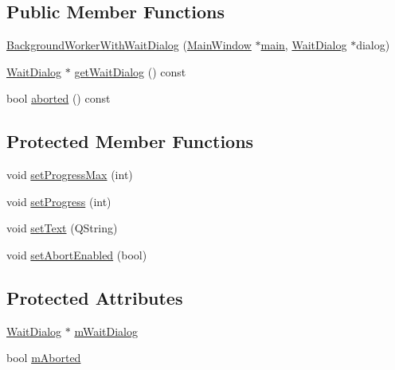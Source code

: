 \subsection*{Public Member Functions}
\begin{DoxyCompactItemize}
\item 
\mbox{\hyperlink{class_background_worker_with_wait_dialog_a08183457d88d75535d04dabe4cca054c}{Background\+Worker\+With\+Wait\+Dialog}} (\mbox{\hyperlink{class_main_window}{Main\+Window}} $\ast$\mbox{\hyperlink{tseditor_8cpp_a0ddf1224851353fc92bfbff6f499fa97}{main}}, \mbox{\hyperlink{class_wait_dialog}{Wait\+Dialog}} $\ast$dialog)
\item 
\mbox{\hyperlink{class_wait_dialog}{Wait\+Dialog}} $\ast$ \mbox{\hyperlink{class_background_worker_with_wait_dialog_a894bacbc35d673d590ebb5a6ab35a6ae}{get\+Wait\+Dialog}} () const
\item 
bool \mbox{\hyperlink{class_background_worker_with_wait_dialog_a69cf3dcfd7e70265bf3183ebae7cbb3e}{aborted}} () const
\end{DoxyCompactItemize}
\subsection*{Protected Member Functions}
\begin{DoxyCompactItemize}
\item 
void \mbox{\hyperlink{class_background_worker_with_wait_dialog_a30a068ba9e1d62d5e612bc19246c79bd}{set\+Progress\+Max}} (int)
\item 
void \mbox{\hyperlink{class_background_worker_with_wait_dialog_a20d1050c20550a82493f475a4b438ba0}{set\+Progress}} (int)
\item 
void \mbox{\hyperlink{class_background_worker_with_wait_dialog_a1a45199885114d5f9940dff1253d2a31}{set\+Text}} (Q\+String)
\item 
void \mbox{\hyperlink{class_background_worker_with_wait_dialog_a19409fbbcbca84367eca808dddd12659}{set\+Abort\+Enabled}} (bool)
\end{DoxyCompactItemize}
\subsection*{Protected Attributes}
\begin{DoxyCompactItemize}
\item 
\mbox{\hyperlink{class_wait_dialog}{Wait\+Dialog}} $\ast$ \mbox{\hyperlink{class_background_worker_with_wait_dialog_a3825f39e47aead7395fc48996da7641a}{m\+Wait\+Dialog}}
\item 
bool \mbox{\hyperlink{class_background_worker_with_wait_dialog_a094856291ffb7aba4208b1af90866152}{m\+Aborted}}
\end{DoxyCompactItemize}


